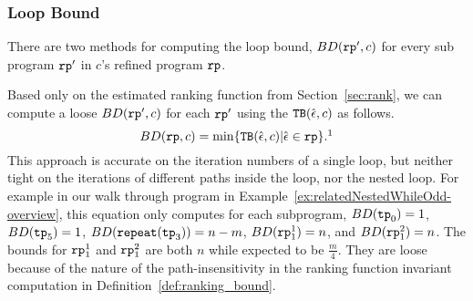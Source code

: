 
\subsubsection{Loop Bound}
There are two methods for computing the loop bound, $BD(\mathtt{rp}', c)$ for every sub program $\mathtt{rp}'$ in $c$'s refined program $\mathtt{rp}$.
%

Based only on the estimated ranking function from Section~\ref{sec:rank}, we can compute a loose $BD(\mathtt{rp}', c)$ for each $\mathtt{rp}'$
using the ${\mathtt{TB}}(\hat{\mathtt{\epsilon}{}}, c)$ as follows.
\begin{equation}
  \label{eq:absBD}
  BD(\rprog, c) = \min\left\{ \absclr(\absevent, c) \middle\vert \absevent \in \rprog \right\}.\footnotemark
\end{equation}
%
This approach is accurate on the iteration numbers of a single loop, but neither tight on the iterations of different paths inside the loop, nor the nested loop.
For example in our walk through program in Example~\ref{ex:relatedNestedWhileOdd-overview},
this equation only computes for each subprogram,
$BD(\mathtt{tp}_0) = 1$, $BD(\mathtt{tp}_5) = 1$, $BD(\mathtt{repeat}(\mathtt{tp}_3)) = n - m$, $BD(\mathtt{rp}_1^1) = n$, and $BD(\mathtt{rp}_1^2) = n $.
The bounds for $\mathtt{rp}_1^1$ and $\mathtt{rp}_1^2$ are both $n$ while expected to be $\frac{m}{4}$.
They are loose because of the nature of the path-insensitivity in the ranking function invariant computation in Definition~\ref{def:ranking_bound}. 

